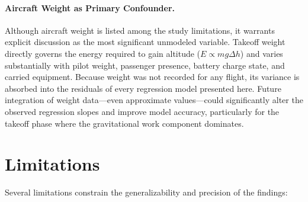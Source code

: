 \documentclass[11pt,a4paper]{article}
\begin{document}
\paragraph{Aircraft Weight as Primary Confounder.}
Although aircraft weight is listed among the study limitations, it warrants explicit discussion as the most significant unmodeled variable.
Takeoff weight directly governs the energy required to gain altitude ($E \propto m g \Delta h$) and varies substantially with pilot weight, passenger presence, battery charge state, and carried equipment.
Because weight was not recorded for any flight, its variance is absorbed into the residuals of every regression model presented here.
Future integration of weight data---even approximate values---could significantly alter the observed regression slopes and improve model accuracy, particularly for the takeoff phase where the gravitational work component dominates.

\section{Limitations}

Several limitations constrain the generalizability and precision of the findings:
\end{document}
